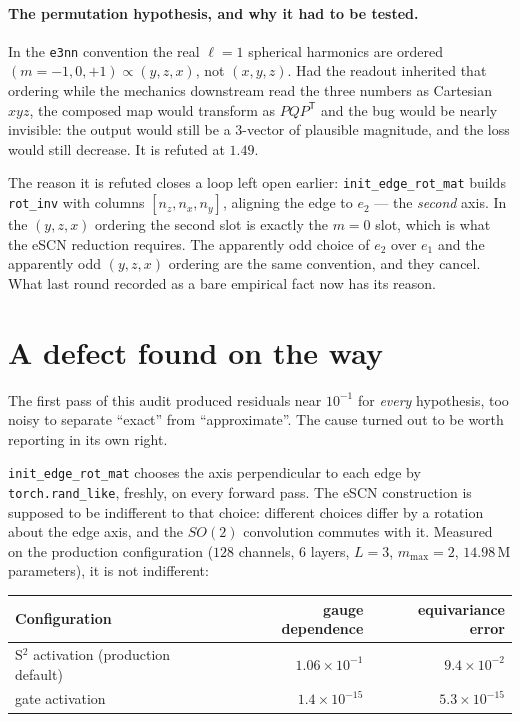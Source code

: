 \documentclass[11pt,a4paper]{report}
\theoremstyle{definition}
\theoremstyle{remark}
\newcommand{\pyfunc}[1]{\texttt{#1}}
\begin{document}
\paragraph{The permutation hypothesis, and why it had to be tested.}
In the \texttt{e3nn} convention the real $\ell=1$ spherical harmonics are
ordered $(m=-1,0,+1)\propto(y,z,x)$, not $(x,y,z)$. Had the readout inherited
that ordering while the mechanics downstream read the three numbers as
Cartesian $xyz$, the composed map would transform as $PQP^{\mathsf T}$ and
the bug would be nearly invisible: the output would still be a $3$-vector of
plausible magnitude, and the loss would still decrease. It is refuted at
$1.49$.

The reason it is refuted closes a loop left open earlier: \pyfunc{init\_edge\_rot\_mat}
builds \texttt{rot\_inv} with columns $[n_z,n_x,n_y]$, aligning the edge to
$e_2$ --- the \emph{second} axis. In the $(y,z,x)$ ordering the second slot is
exactly the $m=0$ slot, which is what the eSCN reduction requires. The
apparently odd choice of $e_2$ over $e_1$ and the apparently odd $(y,z,x)$
ordering are the same convention, and they cancel. What last round recorded
as a bare empirical fact now has its reason.

\section{A defect found on the way}
\label{sec:head-s2-caveat}

The first pass of this audit produced residuals near $10^{-1}$ for
\emph{every} hypothesis, too noisy to separate ``exact'' from
``approximate''. The cause turned out to be worth reporting in its own right.

\pyfunc{init\_edge\_rot\_mat} chooses the axis perpendicular to each edge by
\texttt{torch.rand\_like}, freshly, on every forward pass. The eSCN
construction is supposed to be indifferent to that choice: different choices
differ by a rotation about the edge axis, and the $SO(2)$ convolution
commutes with it. Measured on the production configuration
($128$ channels, $6$ layers, $L=3$, $m_{\max}=2$, $14.98$\,M parameters), it
is not indifferent:

\begin{center}
\begin{tabular}{lrr}
\toprule
Configuration & gauge dependence & equivariance error \\
\midrule
S$^2$ activation (production default) & $1.06\times10^{-1}$ & $9.4\times10^{-2}$ \\
gate activation & $1.4\times10^{-15}$ & $5.3\times10^{-15}$ \\
\bottomrule
\end{tabular}
\end{center}
\end{document}
